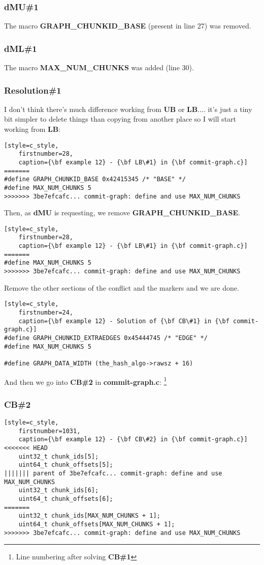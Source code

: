 \subsubsection{dMU\#1}
The macro {\bf GRAPH\_CHUNKID\_BASE} (present in line 27) was removed.

\subsubsection{dML\#1}
The macro {\bf MAX\_NUM\_CHUNKS} was added (line 30).

\subsubsection{Resolution\#1}
I don't think there's much difference working from {\bf UB} or {\bf LB}.... it's just a tiny bit simpler to
delete things than copying from another place so I will start working from {\bf LB}:

\begin{lstlisting}[style=c_style,
	firstnumber=28,
	caption={\bf example 12} - {\bf LB\#1} in {\bf commit-graph.c}]
=======
#define GRAPH_CHUNKID_BASE 0x42415345 /* "BASE" */
#define MAX_NUM_CHUNKS 5
>>>>>>> 3be7efcafc... commit-graph: define and use MAX_NUM_CHUNKS
\end{lstlisting}

Then, as {\bf dMU} is requesting, we remove {\bf GRAPH\_CHUNKID\_BASE}.

\begin{lstlisting}[style=c_style,
	firstnumber=28,
	caption={\bf example 12} - {\bf LB\#1} in {\bf commit-graph.c}]
=======
#define MAX_NUM_CHUNKS 5
>>>>>>> 3be7efcafc... commit-graph: define and use MAX_NUM_CHUNKS
\end{lstlisting}

Remove the other sections of the conflict and the markers and we are done.

\begin{lstlisting}[style=c_style,
	firstnumber=24,
	caption={\bf example 12} - Solution of {\bf CB\#1} in {\bf commit-graph.c}]
#define GRAPH_CHUNKID_EXTRAEDGES 0x45444745 /* "EDGE" */
#define MAX_NUM_CHUNKS 5

#define GRAPH_DATA_WIDTH (the_hash_algo->rawsz + 16)
\end{lstlisting}

And then we go into {\bf CB\#2} in {\bf commit-graph.c}:
\footnote{Line numbering after solving {\bf CB\#1}}
\subsubsection{CB\#2}
\begin{lstlisting}[style=c_style,
	firstnumber=1031,
	caption={\bf example 12} - {\bf CB\#2} in {\bf commit-graph.c}]
<<<<<<< HEAD
	uint32_t chunk_ids[5];
	uint64_t chunk_offsets[5];
||||||| parent of 3be7efcafc... commit-graph: define and use MAX_NUM_CHUNKS
	uint32_t chunk_ids[6];
	uint64_t chunk_offsets[6];
=======
	uint32_t chunk_ids[MAX_NUM_CHUNKS + 1];
	uint64_t chunk_offsets[MAX_NUM_CHUNKS + 1];
>>>>>>> 3be7efcafc... commit-graph: define and use MAX_NUM_CHUNKS
\end{lstlisting}


